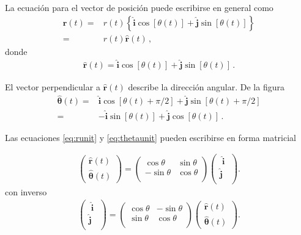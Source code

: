 La ecuaci\'on para el vector de posici\'on puede escribirse en general como
\begin{align}
\label{eq:rpol}
  \mathbf{r}(t)=&r(t)\left\{\hat{\mathbf{i}}\cos[\theta(t)]+\hat{\mathbf{j}}\sin[\theta(t)]\right\}\nonumber\\
=&r(t)\hat{\mathbf{r}}(t)\,,
\end{align}
donde
\begin{align}
\label{eq:runit}
  \hat{\mathbf{r}}(t)=\hat{\mathbf{i}}\cos[\theta(t)]+\hat{\mathbf{j}}\sin[\theta(t)]\,.
\end{align}


El vector perpendicular a $\hat{\mathbf{r}}(t)$ describe la dirección angular. De la figura %
\begin{align}
\label{eq:thetaunit}
  \hat{\boldsymbol{\theta}}(t)=&\hat{\mathbf{i}}\cos[\theta(t)+\pi/2]+\hat{\mathbf{j}}\sin[\theta(t)+\pi/2]\nonumber\\
=&-\hat{\mathbf{i}}\sin[\theta(t)]+\hat{\mathbf{j}}\cos[\theta(t)]\,.
\end{align}

Las ecuaciones \eqref{eq:runit} y \eqref{eq:thetaunit} pueden escribirse en forma matricial


\begin{align}
  \label{eq:polinv}
  \begin{pmatrix}
    \hat{\mathbf{r}}(t)\\
    \hat{\boldsymbol{\theta}}(t)
  \end{pmatrix}=
  \begin{pmatrix}
    \cos\theta&\sin\theta\\
    -\sin\theta&\cos\theta\\
  \end{pmatrix}
  \begin{pmatrix}
    \;\hat{\mathbf{i}}\;\\
    \hat{\mathbf{j}}\\
  \end{pmatrix}.
\end{align}
con inverso
\begin{align}
  \begin{pmatrix}
    \;\hat{\mathbf{i}}\;\\
    \hat{\mathbf{j}}\\
  \end{pmatrix}=
  \begin{pmatrix}
    \cos\theta&-\sin\theta\\
    \sin\theta&\cos\theta\\
  \end{pmatrix}
  \begin{pmatrix}
    \hat{\mathbf{r}}(t)\\
    \hat{\boldsymbol{\theta}}(t)
  \end{pmatrix}.
\end{align}

